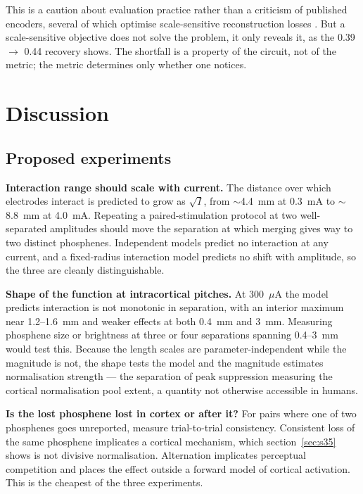 \documentclass[10pt,twocolumn]{article}
\newcommand{\uA}{\ensuremath{\mu\text{A}}}
\begin{document}
This is a caution about evaluation practice rather than a criticism of
published encoders, several of which optimise scale-sensitive
reconstruction losses \citep{granley2022,deruyter2022}. But a
scale-sensitive objective does not solve the problem, it only reveals it, as
the 0.39 $\to$ 0.44 recovery shows. The shortfall is a property of the
circuit, not of the metric; the metric determines only whether one notices.

\section{Discussion}

\subsection{Proposed experiments}
\label{sec:experiments}

\textbf{Interaction range should scale with current.} The distance over
which electrodes interact is predicted to grow as $\sqrt{I}$, from
$\sim$4.4~mm at 0.3~mA to $\sim$8.8~mm at 4.0~mA. Repeating a
paired-stimulation protocol at two well-separated amplitudes should move
the separation at which merging gives way to two distinct phosphenes.
Independent models predict no interaction at any current, and a
fixed-radius interaction model predicts no shift with amplitude, so the
three are cleanly distinguishable.

\textbf{Shape of the function at intracortical pitches.} At 300~\uA{} the
model predicts interaction is not monotonic in separation, with an interior
maximum near 1.2--1.6~mm and weaker effects at both 0.4~mm and 3~mm.
Measuring phosphene size or brightness at three or four separations
spanning 0.4--3~mm would test this. Because the length scales are
parameter-independent while the magnitude is not, the shape tests the model
and the magnitude estimates normalisation strength --- the separation of
peak suppression measuring the cortical normalisation pool extent, a
quantity not otherwise accessible in humans.

\textbf{Is the lost phosphene lost in cortex or after it?} For pairs where
one of two phosphenes goes unreported, measure trial-to-trial consistency.
Consistent loss of the same phosphene implicates a cortical mechanism,
which section~\ref{sec:s35} shows is not divisive normalisation.
Alternation implicates perceptual competition and places the effect outside
a forward model of cortical activation. This is the cheapest of the three
experiments.
\end{document}
